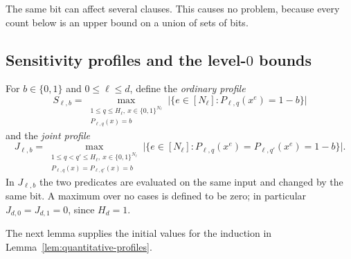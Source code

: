 \documentclass[11pt]{article}
\theoremstyle{definition}
\theoremstyle{remark}
\begin{document}
The same bit can affect several clauses. This causes no problem, because every
count below is an upper bound on a union of sets of bits.

\subsection{Sensitivity profiles and the level-\(0\) bounds}
For \(b\in\{0,1\}\) and \(0\le\ell\le d\), define the \emph{ordinary profile}
\[
 S_{\ell,b}=\max_{\substack{1\le q\le H_\ell,\ x\in\{0,1\}^{N_\ell}\\
                           P_{\ell,q}(x)=b}}
 \bigl|\{e\in[N_\ell]:P_{\ell,q}(x^e)=1-b\}\bigr|
\]
and the \emph{joint profile}
\[
 J_{\ell,b}=\max_{\substack{1\le q<q'\le H_\ell,\ x\in\{0,1\}^{N_\ell}\\
                         P_{\ell,q}(x)=P_{\ell,q'}(x)=b}}
 \bigl|\{e\in[N_\ell]:P_{\ell,q}(x^e)=P_{\ell,q'}(x^e)=1-b\}\bigr|.
\]
In \(J_{\ell,b}\) the two predicates are evaluated on the same input and
changed by the same bit. A maximum over no cases is defined to be zero; in
particular \(J_{d,0}=J_{d,1}=0\), since \(H_d=1\).

The next lemma supplies the initial values for the induction in
Lemma~\ref{lem:quantitative-profiles}.
\end{document}

